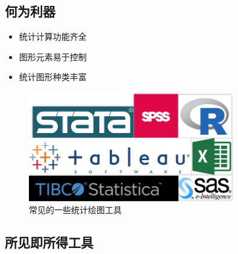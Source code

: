\documentclass{beamerthemeMono}
\begin{document}
\subsection{何为利器}
\begin{frame}[t]{\subsecname}
  \begin{itemize}
    \item 统计计算功能齐全
    \item 图形元素易于控制
    \item 统计图形种类丰富
  \end{itemize}

\begin{figure}[ht]
  \centering \includegraphics[width=0.8\textwidth]{stat_tools.png}
  \caption{常见的一些统计绘图工具}
\end{figure}
\end{frame}

\subsection{所见即所得工具}
\end{document}
